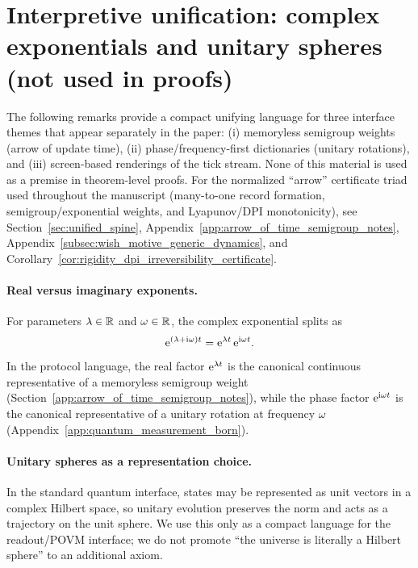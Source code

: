 \section*{Interpretive unification: complex exponentials and unitary spheres (not used in proofs)}
\label{subsec:interpretive_unification_complex_exp}
\AuditTag The following remarks provide a compact unifying language for three interface themes that appear separately in the paper: (i) memoryless semigroup weights (arrow of update time), (ii) phase/frequency-first dictionaries (unitary rotations), and (iii) screen-based renderings of the tick stream.
None of this material is used as a premise in theorem-level proofs.
\AuditTag For the normalized ``arrow'' certificate triad used throughout the manuscript (many-to-one record formation, semigroup/exponential weights, and Lyapunov/DPI monotonicity), see Section~\ref{sec:unified_spine}, Appendix~\ref{app:arrow_of_time_semigroup_notes}, Appendix~\ref{subsec:wish_motive_generic_dynamics}, and Corollary~\ref{cor:rigidity_dpi_irreversibility_certificate}.

\paragraph{Real versus imaginary exponents.}
For parameters $\lambda\in\mathbb{R}$ and $\omega\in\mathbb{R}$, the complex exponential splits as
\[
\mathrm{e}^{(\lambda+\mathrm{i}\omega)t} = \mathrm{e}^{\lambda t}\,\mathrm{e}^{\mathrm{i}\omega t}.
\]
\AuditTag In the protocol language, the real factor $\mathrm{e}^{\lambda t}$ is the canonical continuous representative of a memoryless semigroup weight (Section~\ref{app:arrow_of_time_semigroup_notes}), while the phase factor $\mathrm{e}^{\mathrm{i}\omega t}$ is the canonical representative of a unitary rotation at frequency $\omega$ (Appendix~\ref{app:quantum_measurement_born}).

\paragraph{Unitary spheres as a representation choice.}
In the standard quantum interface, states may be represented as unit vectors in a complex Hilbert space, so unitary evolution preserves the norm and acts as a trajectory on the unit sphere.
\AuditTag We use this only as a compact language for the readout/POVM interface; we do not promote ``the universe is literally a Hilbert sphere'' to an additional axiom.


